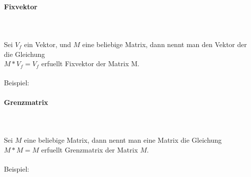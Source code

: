 \documentclass[a4paper]{article} %
\begin{document}
	\newpage
	\paragraph{Fixvektor}
		\hspace{0 cm} \\ \noindent \\
	Sei  $V_f$ ein Vektor, und $M$ eine beliebige Matrix, dann nennt man den Vektor der die Gleichung \\	$M * V_f = V_f$ erfuellt Fixvektor der Matrix M.\\\\
	Beispiel:

	\paragraph{Grenzmatrix}
	 \hspace{0 cm} \\ \noindent \\
	Sei $M$ eine beliebige Matrix, dann nennt man eine Matrix die Gleichung $M * M = M$ erfuellt Grenzmatrix der Matrix $M$.
	\\\\
	Beispiel:
	\newpage
\end{document}
